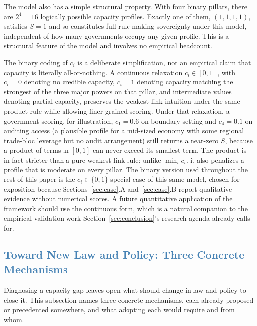 \documentclass[journal]{IEEEtran}
\begin{document}
The model also has a simple structural property. With four binary pillars, there are $2^4 = 16$ logically possible capacity profiles. Exactly one of them, $(1,1,1,1)$, satisfies $S=1$ and so constitutes full rule-making sovereignty under this model, independent of how many governments occupy any given profile. This is a structural feature of the model and involves no empirical headcount.

The binary coding of $c_i$ is a deliberate simplification, not an empirical claim that capacity is literally all-or-nothing. A continuous relaxation $c_i \in [0,1]$, with $c_i=0$ denoting no credible capacity, $c_i=1$ denoting capacity matching the strongest of the three major powers on that pillar, and intermediate values denoting partial capacity, preserves the weakest-link intuition under the same product rule while allowing finer-grained scoring. Under that relaxation, a government scoring, for illustration, $c_1=0.6$ on boundary-setting and $c_4=0.1$ on auditing access (a plausible profile for a mid-sized economy with some regional trade-bloc leverage but no audit arrangement) still returns a near-zero $S$, because a product of terms in $[0,1]$ can never exceed its smallest term. The product is in fact stricter than a pure weakest-link rule: unlike $\min_i c_i$, it also penalizes a profile that is moderate on every pillar. The binary version used throughout the rest of this paper is the $c_i\in\{0,1\}$ special case of this same model, chosen for exposition because Sections~\ref{sec:case}.A and~\ref{sec:case}.B report qualitative evidence without numerical scores. A future quantitative application of the framework should use the continuous form, which is a natural companion to the empirical-validation work Section~\ref{sec:conclusion}'s research agenda already calls for.

\subsection{\textcolor{steelblue}{Toward New Law and Policy: Three Concrete Mechanisms}}

Diagnosing a capacity gap leaves open what should change in law and policy to close it. This subsection names three concrete mechanisms, each already proposed or precedented somewhere, and what adopting each would require and from whom.
\end{document}
